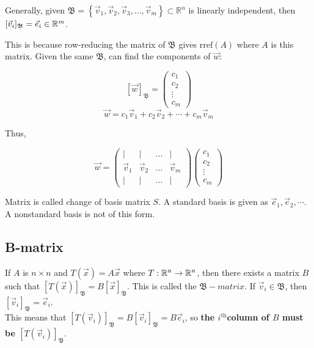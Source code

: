 \begin{framed}
\noindent
Generally, given $\mathfrak{B}=\left\{ \vec v_1, \vec v_2, \vec v_3, \dots, \vec v_m \right\}\subset \mathbb{R}^n$
is linearly independent, then $[\vec{v}_i]_{\mathfrak{B}}=\vec{e}_i\in\mathbb{R}^m$.
\end{framed}

This is because row-reducing the matrix of $\mathfrak{B}$ gives $\mathrm{rref}(A)$ where $A$ is this matrix. Given the same
$\mathfrak{B}$, can find the components of $\vec{w}$:

\[\left[\vec w \right]_\mathfrak{B}=\begin{pmatrix}c_1\\c_2\\ \vdots\\ c_m\end{pmatrix}\]
\[\vec{w}=c_{1} \vec{v}_{1}+c_{2} \vec{v}_{2}+\cdots+c_{m} \vec{v}_{m}\]

Thus,

\[\vec w = \begin{pmatrix}|&|&\dots&|\\ \vec v_1 &\vec v_2 & \dots &\vec v_m\\  |&|&\dots&| \end{pmatrix}\begin{pmatrix}c_1\\c_2\\\vdots\\c_m\end{pmatrix}\]

Matrix is called change of basis matrix $S$. A standard basis is given as $\vec{e}_1,\vec{e}_2,\cdots$. A nonstandard basis is not of this form.

\subsection{B-matrix}

If $A$ is $n\times n$ and $T(\vec{x})=A\vec{x}$ where $T:\mathbb{R}^n\rightarrow \mathbb{R}^n$, then there exists a matrix $B$ such that
$\left[T(\vec x)\right]_\mathfrak{B}=B\left[\vec x\right]_\mathfrak{B}$. This is called the $\mathfrak{B}-matrix$.
If $\vec{v}_i\in \mathfrak{B}$, then $[\vec{v}_i]_\mathfrak{B}=\vec{e}_i$.\\

\noindent
This means that 
$\left[T(\vec v_i)\right]_\mathfrak{B}=B\left[\vec v_i \right]_\mathfrak{B}=B\vec e_i$, so 
\textbf{the $i^{\mathrm{th}}$column of $B$ must be $[T(\vec{v}_i)]_\mathfrak{B}$}.\\


